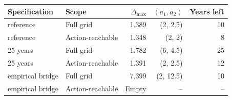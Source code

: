 \begin{tabular}{llrrr}
\toprule
Specification & Scope & $\Delta_{\max}$ & $(a_1,a_2)$ & Years left \\
\midrule
reference & Full grid & 1.389 & (2, 2.5) & 10 \\
reference & Action-reachable & 1.348 & (2, 2) & 8 \\
25 years & Full grid & 1.782 & (6, 4.5) & 25 \\
25 years & Action-reachable & 1.391 & (2, 2.5) & 12 \\
empirical bridge & Full grid & 7.399 & (2, 12.5) & 10 \\
empirical bridge & Action-reachable & Empty & -- & -- \\
\bottomrule
\end{tabular}
